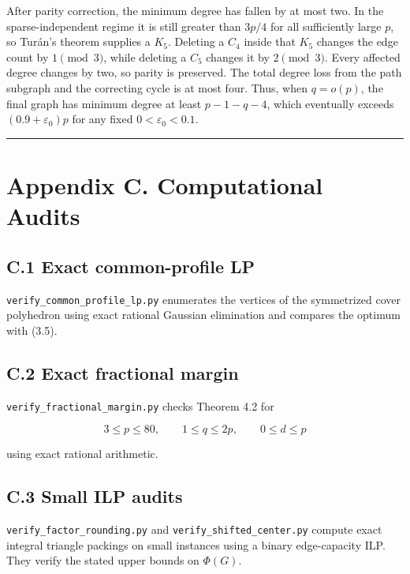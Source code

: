 \documentclass[11pt,a4paper]{article}
\begin{document}
After parity correction, the minimum degree has fallen by at most two. In the sparse-independent regime it is still greater than \(3p/4\) for all sufficiently large \(p\), so Turán's theorem supplies a \(K_5\). Deleting a \(C_4\) inside that \(K_5\) changes the edge count by \(1\pmod3\), while deleting a \(C_5\) changes it by \(2\pmod3\). Every affected degree changes by two, so parity is preserved. The total degree loss from the path subgraph and the correcting cycle is at most four. Thus, when \(q=o(p)\), the final graph has minimum degree at least \(p-1-q-4\), which eventually exceeds \((0.9+\varepsilon_0)p\) for any fixed \(0<\varepsilon_0<0.1\).

\begin{center}\rule{0.5\linewidth}{0.5pt}\end{center}

\section{Appendix C. Computational Audits}\label{appendix-c.-computational-audits}

\subsection{C.1 Exact common-profile LP}\label{c.1-exact-common-profile-lp}

\texttt{verify\_common\_profile\_lp.py} enumerates the vertices of the symmetrized cover polyhedron using exact rational Gaussian elimination and compares the optimum with (3.5).

\subsection{C.2 Exact fractional margin}\label{c.2-exact-fractional-margin}

\texttt{verify\_fractional\_margin.py} checks Theorem 4.2 for

\[
3\le p\le80,
\qquad
1\le q\le2p,
\qquad
0\le d\le p
\]

using exact rational arithmetic.

\subsection{C.3 Small ILP audits}\label{c.3-small-ilp-audits}

\texttt{verify\_factor\_rounding.py} and \texttt{verify\_shifted\_center.py} compute exact integral triangle packings on small instances using a binary edge-capacity ILP. They verify the stated upper bounds on \(\Phi(G)\).
\end{document}
